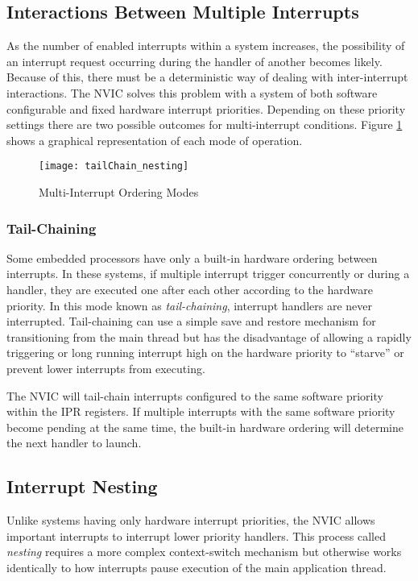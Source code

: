 \documentclass[11pt,fleqn]{book} %
\begin{document}
\subsection{Interactions Between Multiple Interrupts}
As the number of enabled interrupts within a system increases, the possibility of an interrupt request occurring during the handler of another becomes likely. Because of this, there must be a deterministic way of dealing with inter-interrupt interactions. The NVIC solves this problem with a system of both software configurable and fixed hardware interrupt priorities. Depending on these priority settings there are two possible outcomes for multi-interrupt conditions. Figure \ref{tailChain_nesting} shows a graphical representation of each mode of operation.

\begin{figure}[]
    \centering\texttt{[image: tailChain\_nesting]}
    \caption{Multi-Interrupt Ordering Modes}
    \label{tailChain_nesting}
\end{figure}

\subsubsection{Tail-Chaining}
Some embedded processors have only a built-in hardware ordering between interrupts. In these systems, if multiple interrupt trigger concurrently or during a handler, they are executed one after each other according to the hardware priority. In this mode known as \textit{tail-chaining}, interrupt handlers are never interrupted. Tail-chaining can use a simple save and restore mechanism for transitioning from the main thread but has the disadvantage of allowing a rapidly triggering or long running interrupt high on the hardware priority to ``starve'' or prevent lower interrupts from executing. 

The NVIC will tail-chain interrupts configured to the same software priority within the IPR registers. If multiple interrupts with the same software priority become pending at the same time, the built-in hardware ordering will determine the next handler to launch.

\subsection{Interrupt Nesting}
Unlike systems having only hardware interrupt priorities, the NVIC allows important interrupts to interrupt lower priority handlers. This process called \textit{nesting} requires a more complex context-switch mechanism but otherwise works identically to how interrupts pause execution of the main application thread. 
\end{document}
